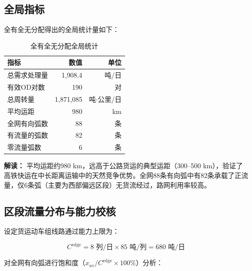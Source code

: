 \documentclass[12pt,a4paper,fontset=none]{ctexart}
\begin{document}
\subsection{全局指标}

全有全无分配得出的全局统计量如下：

\begin{table}[H]
\centering
\caption{全有全无分配全局统计}
\begin{tabular}{lrr}
\toprule
\textbf{指标} & \textbf{数值} & \textbf{单位} \\
\midrule
总需求处理量  & 1,908.4  & 吨/日 \\
有效OD对数    & 190      & 对 \\
总周转量      & 1,871,085 & 吨$\cdot$公里/日 \\
平均运距      & 980      & km \\
全网有向弧数  & 88       & 条 \\
有流量的弧数  & 82       & 条 \\
零流量弧数    & 6        & 条 \\
\bottomrule
\end{tabular}
\end{table}

\textbf{解读：} 平均运距约980 km，远高于公路货运的典型运距（300--500 km），验证了高铁快运在中长距离运输中的天然竞争优势。全网88条有向弧中有82条承载了正流量，仅6条弧（主要为西部偏远区段）无货流经过，路网利用率较高。

\subsection{区段流量分布与能力校核}

设定货运动车组线路通过能力上限为：

\begin{equation}
C^{\text{edge}} = 8 \text{ 列/日} \times 85 \text{ 吨/列} = 680 \text{ 吨/日}
\end{equation}

对全网有向弧进行饱和度（$x_{uv} / C^{\text{edge}} \times 100\%$）分析：
\end{document}
